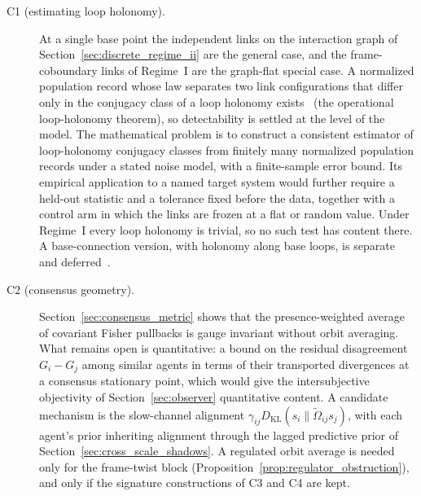 \documentclass[11pt]{article}
\begin{document}
\begin{description}
\item[C1 (estimating loop holonomy).] At a single base point the independent links on the interaction graph of Section~\ref{sec:discrete_regime_ii} are the general case, and the frame-coboundary links of Regime~I are the graph-flat special case. A normalized population record whose law separates two link configurations that differ only in the conjugacy class of a loop holonomy exists~\cite[Ch.~10]{DennisGaugeVFE2026} (the operational loop-holonomy theorem), so detectability is settled at the level of the model. The mathematical problem is to construct a consistent estimator of loop-holonomy conjugacy classes from finitely many normalized population records under a stated noise model, with a finite-sample error bound. Its empirical application to a named target system would further require a held-out statistic and a tolerance fixed before the data, together with a control arm in which the links are frozen at a flat or random value. Under Regime~I every loop holonomy is trivial, so no such test has content there. A base-connection version, with holonomy along base loops, is separate and deferred~\cite{DennisGaugeVFESuppB2026}.
\item[C2 (consensus geometry).] Section~\ref{sec:consensus_metric} shows that the presence-weighted average of covariant Fisher pullbacks is gauge invariant without orbit averaging. What remains open is quantitative: a bound on the residual disagreement $G_i - G_j$ among similar agents in terms of their transported divergences at a consensus stationary point, which would give the intersubjective objectivity of Section~\ref{sec:observer} quantitative content. A candidate mechanism is the slow-channel alignment $\gamma_{ij} D_{\mathrm{KL}}(s_i \| \tilde\Omega_{ij} s_j)$, with each agent's prior inheriting alignment through the lagged predictive prior of Section~\ref{sec:cross_scale_shadows}. A regulated orbit average is needed only for the frame-twist block (Proposition~\ref{prop:regulator_obstruction}), and only if the signature constructions of C3 and C4 are kept.

\end{description}
\end{document}
